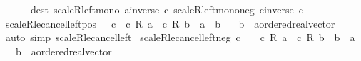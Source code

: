 \begin{isabellebody}
\ \ \ \ \ \ dest{\isacharcolon}{\kern0pt}\ scaleR{\isacharunderscore}{\kern0pt}left{\isacharunderscore}{\kern0pt}mono{\isacharbrackleft}{\kern0pt}\ a{\isacharequal}{\kern0pt}{\isachardoublequoteopen}inverse\ c{\isachardoublequoteclose}{\isacharbrackright}{\kern0pt}\ scaleR{\isacharunderscore}{\kern0pt}left{\isacharunderscore}{\kern0pt}mono{\isacharunderscore}{\kern0pt}neg{\isacharbrackleft}{\kern0pt}\ c{\isacharequal}{\kern0pt}{\isachardoublequoteopen}inverse\ c{\isachardoublequoteclose}{\isacharbrackright}{\kern0pt}{\isacharparenright}{\kern0pt}%
\endisatagproof
{\isafoldproof}%
%
\isadelimproof
\isanewline
%
\endisadelimproof
\isanewline
{}\isamarkupfalse%
\ scaleR{\isacharunderscore}{\kern0pt}le{\isacharunderscore}{\kern0pt}cancel{\isacharunderscore}{\kern0pt}left{\isacharunderscore}{\kern0pt}pos{\isacharcolon}{\kern0pt}\ {\isachardoublequoteopen}{}\ {\isacharless}{\kern0pt}\ c\ {\isasymLongrightarrow}\ c\ {\isacharasterisk}{\kern0pt}\isactrlsub R\ a\ {\isasymle}\ c\ {\isacharasterisk}{\kern0pt}\isactrlsub R\ b\ {\isasymlongleftrightarrow}\ a\ {\isasymle}\ b{\isachardoublequoteclose}\isanewline
\ \ \ b\ {\isacharcolon}{\kern0pt}{\isacharcolon}{\kern0pt}\ {\isachardoublequoteopen}{\isacharprime}{\kern0pt}a{\isacharcolon}{\kern0pt}{\isacharcolon}{\kern0pt}ordered{\isacharunderscore}{\kern0pt}real{\isacharunderscore}{\kern0pt}vector{\isachardoublequoteclose}\isanewline
%
\isadelimproof
\ \ %
\endisadelimproof
%
\isatagproof
{}\isamarkupfalse%
\ {\isacharparenleft}{\kern0pt}auto\ simp{\isacharcolon}{\kern0pt}\ scaleR{\isacharunderscore}{\kern0pt}le{\isacharunderscore}{\kern0pt}cancel{\isacharunderscore}{\kern0pt}left{\isacharparenright}{\kern0pt}%
\endisatagproof
{\isafoldproof}%
%
\isadelimproof
\isanewline
%
\endisadelimproof
\isanewline
{}\isamarkupfalse%
\ scaleR{\isacharunderscore}{\kern0pt}le{\isacharunderscore}{\kern0pt}cancel{\isacharunderscore}{\kern0pt}left{\isacharunderscore}{\kern0pt}neg{\isacharcolon}{\kern0pt}\ {\isachardoublequoteopen}c\ {\isacharless}{\kern0pt}\ {}\ {\isasymLongrightarrow}\ c\ {\isacharasterisk}{\kern0pt}\isactrlsub R\ a\ {\isasymle}\ c\ {\isacharasterisk}{\kern0pt}\isactrlsub R\ b\ {\isasymlongleftrightarrow}\ b\ {\isasymle}\ a{\isachardoublequoteclose}\isanewline
\ \ \ b\ {\isacharcolon}{\kern0pt}{\isacharcolon}{\kern0pt}\ {\isachardoublequoteopen}{\isacharprime}{\kern0pt}a{\isacharcolon}{\kern0pt}{\isacharcolon}{\kern0pt}ordered{\isacharunderscore}{\kern0pt}real{\isacharunderscore}{\kern0pt}vector{\isachardoublequoteclose}\isanewline

\end{isabellebody}
